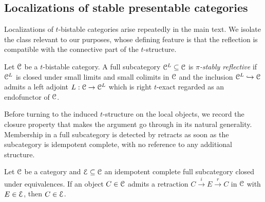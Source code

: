 \subsection{Localizations of stable presentable categories}\label{subsec: localizations of stable categories}
Localizations of $t$-bistable categories arise repeatedly in the main text. We isolate the class relevant to our purposes, whose defining feature is that the reflection is compatible with the connective part of the $t$-structure.
\begin{definition}\label{def: pi stably reflective}
    Let $\EuScript{C}$ be a $t$-bistable category. A full subcategory $\EuScript{C}^{L}\subseteq\EuScript{C}$ is \emph{$\pi$-stably reflective} if $\EuScript{C}^{L}$ is closed under small limits and small colimits in $\EuScript{C}$ and the inclusion $\EuScript{C}^{L}\hookrightarrow\EuScript{C}$ admits a left adjoint $L:\EuScript{C}\to\EuScript{C}^{L}$ which is right $t$-exact regarded as an endofunctor of $\EuScript{C}$.  
\end{definition}
Before turning to the induced $t$-structure on the local objects, we record the closure property that makes the argument go through in its natural generality. Membership in a full subcategory is detected by retracts as soon as the subcategory is idempotent complete, with no reference to any additional structure.
\begin{lemma}\label{lem: retracts in full subcategories}
    Let $\EuScript{C}$ be a category and $\EuScript{E}\subseteq\EuScript{C}$ an idempotent complete full subcategory closed under equivalences. If an object $C\in\EuScript{C}$ admits a retraction $C\xrightarrow{i}E\xrightarrow{r}C$ in $\EuScript{C}$ with $E\in\EuScript{E}$, then $C\in\EuScript{E}$. 
\end{lemma}
